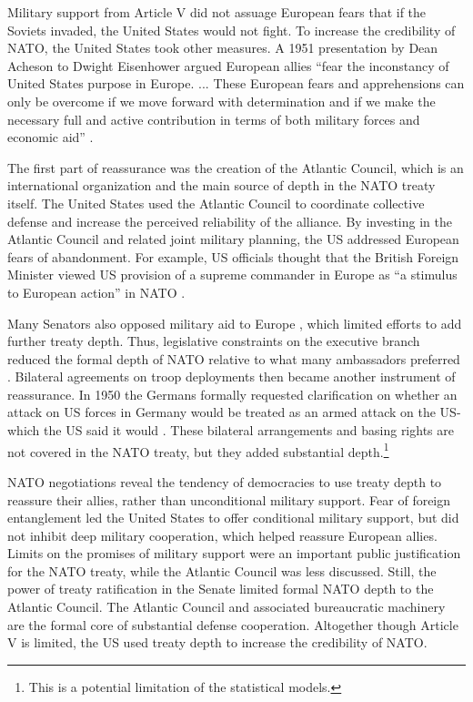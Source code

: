\documentclass[12pt]{article}
\begin{document}
Military support from Article V did not assuage European fears that if the Soviets invaded, the United States would not fight. 
To increase the credibility of NATO, the United States took other measures.  
A 1951 presentation by Dean Acheson to Dwight Eisenhower argued European allies ``fear the inconstancy of United States purpose in Europe. ... These European fears and apprehensions can only be overcome if we move forward with determination and if we make the necessary full and active contribution in terms of both military forces and economic aid'' \citep[pg. 3]{Acheson1951}. 


The first part of reassurance was the creation of the Atlantic Council, which is an international organization and the main source of depth in the NATO treaty itself. 
The United States used the Atlantic Council to coordinate collective defense and increase the perceived reliability of the alliance. 
By investing in the Atlantic Council and related joint military planning, the US addressed European fears of abandonment. 
For example, US officials thought that the British Foreign Minister viewed US provision of a supreme commander in Europe as ``a stimulus to European action'' in NATO \citep{Acheson1950}. 


Many Senators also opposed military aid to Europe \citep[pg 285]{Acheson1969}, which limited efforts to add further treaty depth. 
Thus, legislative constraints on the executive branch reduced the formal depth of NATO relative to what many ambassadors preferred \citep[pg 277]{Acheson1969}. 
Bilateral agreements on troop deployments then became another instrument of reassurance. 
In 1950 the Germans formally requested clarification on whether an attack on US forces in Germany would be treated as an armed attack on the US- which the US said it would \citep[pg. 395]{Acheson1969}.  
These bilateral arrangements and basing rights are not covered in the NATO treaty, but they added substantial depth.\footnote{This is a potential limitation of the statistical models.}  


NATO negotiations reveal the tendency of democracies to use treaty depth to reassure their allies, rather than unconditional military support. 
Fear of foreign entanglement led the United States to offer conditional military support, but did not inhibit deep military cooperation, which helped reassure European allies. 
Limits on the promises of military support were an important public justification for the NATO treaty, while the Atlantic Council was less discussed. 
Still, the power of treaty ratification in the Senate limited formal NATO depth to the Atlantic Council. 
The Atlantic Council and associated bureaucratic machinery are the formal core of substantial defense cooperation. 
Altogether though Article V is limited, the US used treaty depth to increase the credibility of NATO. 
\end{document}
